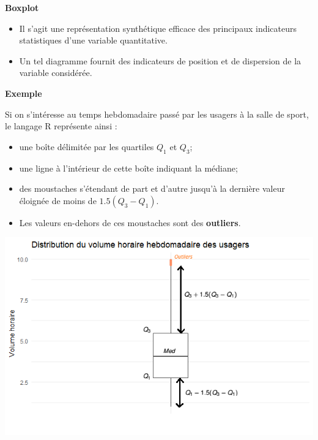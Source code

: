 \documentclass[aspectratio=169,xcolor=dvipsnames]{beamer}
\begin{document}
\begin{frame}
	\begin{block}{\textbf{Boxplot}}
		\begin{itemize}
		\item Il s'agit une représentation synthétique efficace des principaux indicateurs statistiques d'une variable quantitative.
		\item Un tel diagramme fournit des indicateurs de position et de dispersion de la variable considérée.
		\end{itemize}
	\end{block}
\end{frame}

\begin{frame}
	\begin{exampleblock}{\textbf{Exemple}}
	\begin{footnotesize}
	 Si on s'intéresse au temps hebdomadaire passé par les usagers à la salle de sport, le langage \textsf{R} représente ainsi :
			\begin{itemize}
			\item une boîte délimitée par les quartiles $Q_1$ et $Q_3$;
			\item une ligne à l'intérieur de cette boîte indiquant la médiane;
			\item des \og moustaches \fg{} s'étendant de part et d'autre jusqu'à la dernière valeur éloignée de moins de $1.5(Q_3-Q_1)$.
			\item Les valeurs en-dehors de ces \og moustaches \fg{} sont des \textbf{outliers}.
			\end{itemize}
	\end{footnotesize}
		\begin{center}
		\includegraphics[scale=0.35]{box_plot_explain.png}
		\end{center}
	\end{exampleblock}

\end{frame}
\end{document}
